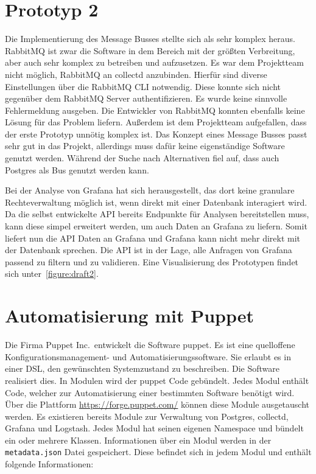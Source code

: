 {\section{Prototyp 2}
Die Implementierung des Message Busses stellte sich als sehr komplex heraus.
RabbitMQ ist zwar die Software in dem Bereich mit der größten Verbreitung, aber
auch sehr komplex zu betreiben und aufzusetzen. Es war dem Projektteam nicht
möglich, RabbitMQ an collectd anzubinden. Hierfür sind diverse Einstellungen
über die RabbitMQ \gls{CLI} notwendig. Diese konnte sich nicht gegenüber dem
RabbitMQ Server authentifizieren. Es wurde keine sinnvolle Fehlermeldung
ausgeben. Die Entwickler von RabbitMQ konnten ebenfalls keine Lösung für das
Problem liefern. Außerdem ist dem Projektteam aufgefallen, dass der erste
Prototyp unnötig komplex ist. Das Konzept eines Message Busses passt sehr gut
in das Projekt, allerdings muss dafür keine eigenständige Software genutzt
werden. Während der Suche nach Alternativen fiel auf, dass auch Postgres als
Bus genutzt werden kann.

Bei der Analyse von Grafana hat sich herausgestellt, das dort keine granulare
Rechteverwaltung möglich ist, wenn direkt mit einer Datenbank interagiert wird.
Da die selbst entwickelte API bereits Endpunkte für Analysen bereitstellen
muss, kann diese simpel erweitert werden, um auch Daten an Grafana zu liefern.
Somit liefert nun die API Daten an Grafana und Grafana kann nicht mehr direkt
mit der Datenbank sprechen. Die API ist in der Lage, alle Anfragen von Grafana
passend zu filtern und zu validieren. Eine Visualisierung des Prototypen
findet sich unter~\ref{figure:draft2}.
\tm%

\section{Automatisierung mit Puppet}
Die Firma Puppet Inc.\ entwickelt die Software puppet. Es ist eine quelloffene
Konfigurationsmanagement- und Automatisierungssoftware. Sie erlaubt es in
einer  \gls{DSL}, den
gewünschten Systemzustand zu beschreiben. Die Software realisiert dies. In
Modulen wird der puppet Code gebündelt. Jedes Modul enthält Code, welcher zur
Automatisierung einer bestimmten Software benötigt wird. Über die Plattform
\url{https://forge.puppet.com/} können diese Module ausgetauscht werden. Es
existieren bereits Module zur Verwaltung von Postgres, collectd, Grafana und
Logstash. Jedes Modul hat seinen eigenen \gls{Namespace} und bündelt ein oder
mehrere Klassen. Informationen über ein Modul werden in der
\texttt{metadata.json} Datei gespeichert. Diese befindet sich in jedem Modul
und enthält folgende Informationen:

}
